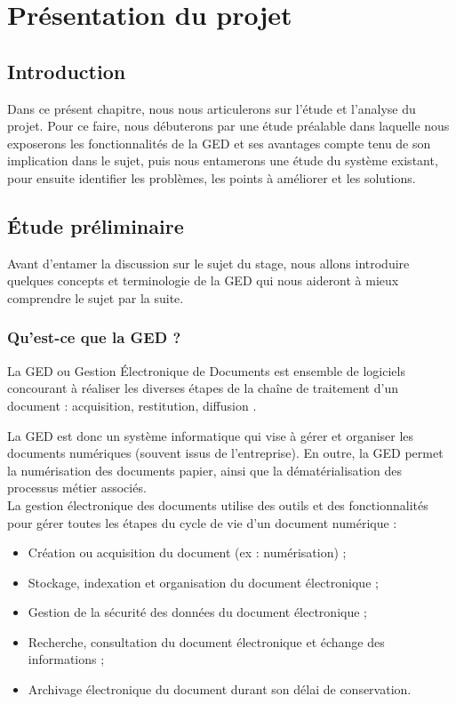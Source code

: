 \section{Présentation du projet}
\subsection*{Introduction}
Dans ce présent chapitre, nous nous articulerons sur l’étude et l’analyse du projet.
Pour ce faire, nous débuterons par une étude préalable dans laquelle nous exposerons les fonctionnalités de la GED et ses avantages compte tenu de son implication dans le sujet, puis nous entamerons une étude du système existant, pour ensuite identifier les problèmes, les points à améliorer et les solutions.
\subsection{Étude préliminaire}
Avant d'entamer la discussion sur le sujet du stage, nous allons introduire quelques concepts et terminologie de la GED qui nous aideront à mieux comprendre le sujet par la suite.
\subsubsection{Qu'est-ce que la GED ?}
\begin{beware}[title=Définition : ]
    La GED ou Gestion Électronique de Documents est ensemble de logiciels concourant à réaliser les diverses étapes de la chaîne de traitement d’un document : acquisition, restitution, diffusion \cite{ged}.
    \end{beware}
    La GED est donc un système informatique qui vise à
    gérer et organiser les documents numériques (souvent issus de l'entreprise). En outre, la GED permet la numérisation des documents papier, ainsi que la dématérialisation des processus métier associés.\\La gestion électronique des documents utilise des outils et des fonctionnalités pour gérer toutes les étapes du cycle de vie d'un document numérique :
\begin{itemize}
    \item Création ou acquisition du document (ex : numérisation) ;
    \item Stockage, indexation et organisation du document électronique ;
    \item Gestion de la sécurité des données du document électronique ;
    \item Recherche, consultation du document électronique et échange des informations ;
    \item Archivage électronique du document durant son délai de conservation.
\end{itemize}
